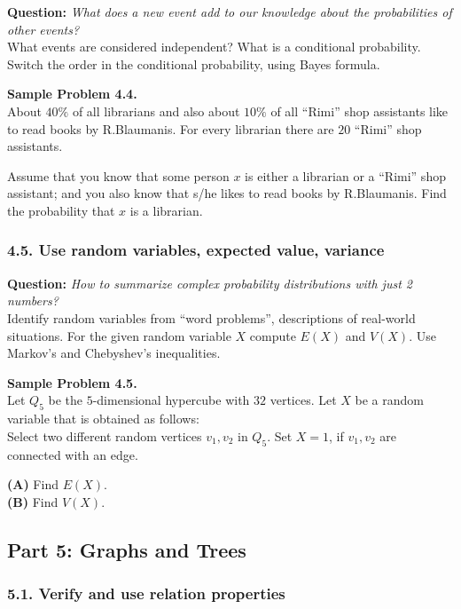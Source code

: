 \documentclass[jou]{apa6}
\begin{document}
{\bf Question:} {\em What does a new event add to our knowledge about 
the probabilities of other events?}\\
{\scriptsize 
What events are considered independent? 
What is a conditional probability. 
Switch the order in the conditional probability, using Bayes formula. 
}


\vspace{6pt}
{\bf Sample Problem 4.4.}\\
About $40\%$ of all librarians 
and also about $10\%$ of all ``Rimi'' shop 
assistants like to read books by R.Blaumanis. 
For every librarian there are $20$ ``Rimi'' 
shop assistants.

Assume that you know that some person $x$ is either a
librarian or a ``Rimi'' shop assistant; and you also know that
s/he likes to read books by R.Blaumanis. 
Find the probability that $x$ is a librarian.



\subsubsection{4.5. Use random variables, expected value, variance}

{\bf Question:} {\em How to summarize complex probability distributions with just 2 numbers?}\\
{\scriptsize
Identify random variables from ``word problems'', descriptions of real-world situations.
For the given random variable $X$ compute $E(X)$ and $V(X)$. Use Markov's and Chebyshev's 
inequalities.
}


\vspace{6pt}
{\bf Sample Problem 4.5.}\\
Let $Q_5$ be the $5$-dimensional hypercube with $32$ vertices. 
Let $X$ be a random variable that is obtained as follows:\\
Select two different random vertices $v_1,v_2$ in $Q_5$. Set $X=1$, 
if $v_1,v_2$ are connected with an edge. 

{\bf (A)} Find $E(X)$. \\
{\bf (B)} Find $V(X)$. 





\newpage
\subsection{Part 5: Graphs and Trees}

\subsubsection{5.1. Verify and use relation properties}
\end{document}
